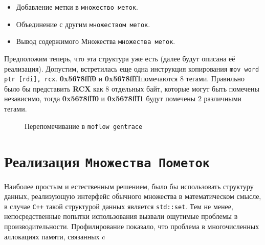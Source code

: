 \begin{itemize}
    \item Добавление метки в \texttt{множество меток}.
    \item Объединение с другим \texttt{множеством меток}.
    \item Вывод содержимого Множества \texttt{множества меток}.
\end{itemize}

Предположим теперь, что эта структура уже есть (далее будут описана её реализация). Допустим, встретилась еще одна инструкция копирования \texttt{mov word ptr [rdi], rcx}. \textbf{0x5678fff0} и \textbf{0x5678fff1}помечаются $8$ тегами. Правильно было бы представить \textbf{RCX} как 8 отдельных байт, которые могут быть помечены независимо, тогда \textbf{0x5678fff0} и \textbf{0x5678fff1} будут помечены $2$ различными тегами.

\begin{figure}[H]
    \caption{Перепомечивание в \texttt{moflow gentrace}}
    \label{fig:moflow3}
\end{figure}

\section{Реализация \texttt{Множества Пометок}}

Наиболее простым и естественным решением, было бы использовать структуру данных, реализующую интерфейс обычного множества в математическом смысле, в случае \texttt{C++} такой структурой данных является \texttt{std::set}. Тем не менее, непосредственные попытки использования вызвали ощутимые проблемы в производительности. Профилирование показало, что проблема в многочисленных аллокациях памяти, связанных c

